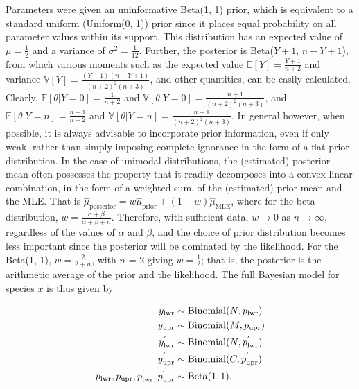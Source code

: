\documentclass[12pt]{article}
\begin{document}
Parameters were given an uninformative Beta(1, 1) prior, which is equivalent to a standard uniform (Uniform(0, 1)) prior since it places equal probability on all parameter values within its support. This distribution has an expected value of $\mu = \frac{1}{2}$ and a variance of $\sigma^2 = \frac{1}{12}$. Further, the posterior is Beta($Y + 1$, $n - Y + 1$), from which various moments such as the expected value $\mathbb{E}[Y] = \frac{Y + 1}{n + 2}$ and variance $\mathbb{V}[Y] = \frac{(Y + 1)(n - Y + 1)}{(n + 2)^2(n + 3)}$, and other quantities, can be easily calculated. Clearly, $\mathbb{E}[\theta|Y = 0] = \frac{1}{n + 2}$ and $\mathbb{V}[\theta|Y = 0] = \frac{n + 1}{(n + 2)^2(n + 3)}$, and \\ $\mathbb{E}[\theta|Y = n] = \frac{n + 1}{n + 2}$ and $\mathbb{V}[\theta|Y = n] = \frac{n + 1}{(n + 2)^2(n + 3)}$. In general however, when possible, it is always advisable to incorporate prior information, even if only weak, rather than simply imposing complete ignorance in the form of a flat prior distribution. In the case of unimodal distributions, the (estimated) posterior mean often possesses the property that it readily decomposes into a convex linear combination, in the form of a weighted sum, of the (estimated) prior mean and the MLE. That is $\hat{\mu}_\mathrm{posterior} = w\hat{\mu}_\mathrm{prior} + (1-w)\hat{\mu}_\mathrm{MLE}$, where for the beta distribution, $w = \frac{\alpha + \beta}{\alpha + \beta + n}$. Therefore, with sufficient data, $w \rightarrow 0$ as $n \rightarrow \infty$, regardless of the values of $\alpha$ and $\beta$, and the choice of prior distribution becomes less important since the posterior will be dominated by the likelihood. For the Beta(1, 1), $w = \frac{2}{2 + n}$, with $n$ = 2 giving $w = \frac{1}{2}$; that is, the posterior is the arithmetic average of the prior and the likelihood. The full Bayesian model for species $x$ is thus given by

\begin{align}
\notag y_\mathrm{lwr} &\sim \mathrm{Binomial}(N, p_\mathrm{lwr}) \\ 
\notag y_\mathrm{upr} &\sim \mathrm{Binomial}(M, p_\mathrm{upr}) \\ 
y^{'}_\mathrm{lwr} &\sim \mathrm{Binomial}(N, p^{'}_\mathrm{lwr}) \\ 
 \notag y^{'}_\mathrm{upr} &\sim \mathrm{Binomial}(C, p^{'}_\mathrm{upr}) \\ 
\notag p_\mathrm{lwr}, p_\mathrm{upr}, p^{'}_\mathrm{lwr}, p^{'}_\mathrm{upr}
&\sim \mathrm{Beta}(1, 1).
\end{align}
\end{document}
